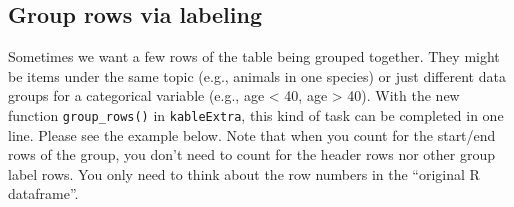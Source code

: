 \documentclass[table]{article}
\newenvironment{Shaded}{\begin{snugshade}}{\end{snugshade}}
\newcommand{\DataTypeTok}[1]{\textcolor[rgb]{0.13,0.29,0.53}{#1}}
\newcommand{\DecValTok}[1]{\textcolor[rgb]{0.00,0.00,0.81}{#1}}
\newcommand{\KeywordTok}[1]{\textcolor[rgb]{0.13,0.29,0.53}{\textbf{#1}}}
\newcommand{\NormalTok}[1]{#1}
\newcommand{\OperatorTok}[1]{\textcolor[rgb]{0.81,0.36,0.00}{\textbf{#1}}}
\newcommand{\StringTok}[1]{\textcolor[rgb]{0.31,0.60,0.02}{#1}}
\begin{document}
\hypertarget{group-rows-via-labeling}{%
\subsection{Group rows via labeling}\label{group-rows-via-labeling}}

Sometimes we want a few rows of the table being grouped together. They
might be items under the same topic (e.g., animals in one species) or
just different data groups for a categorical variable (e.g., age
\textless{} 40, age \textgreater{} 40). With the new function
\texttt{group\_rows()} in \texttt{kableExtra}, this kind of task can be
completed in one line. Please see the example below. Note that when you
count for the start/end rows of the group, you don't need to count for
the header rows nor other group label rows. You only need to think about
the row numbers in the ``original R dataframe''.

\begin{Shaded}
\end{Shaded}
\end{document}
